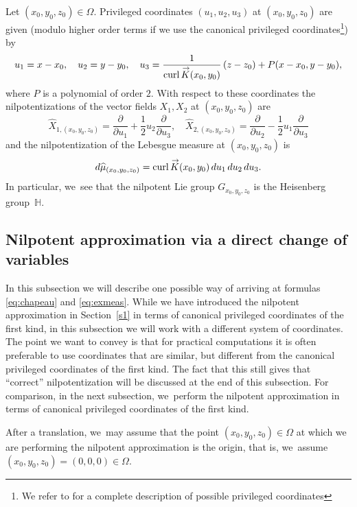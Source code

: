 \documentclass[JEP,XML,SOM,Unicode,published]{cedram}
\DeclareMathOperator{\curl}{curl}
\renewcommand{\vec}[1]
{\overset{\,{\raisebox{-2pt}{$\scriptstyle\to$}}}{#1}}
\theoremstyle{definition}
\newcommand{\1}{\mathbbm{1}}
\begin{document}
Let $(x_0,y_0,z_0)\in\Omega$. Privileged coordinates $(u_1,u_2,u_3)$ at $(x_0,y_0,z_0)$ are given (modulo higher order terms if we use the canonical privileged coordinates\footnote{We refer to \cite{ChoPo1,ChoPo2} for a complete description of possible privileged coordinates}) by
\begin{equation} \label{eq:cdv}
u_1= x-x_0,\quad u_2 = y-y_0,\quad u_3 = \frac{1}{\curl \vec{K} (x_0,y_0)} \,(z-z_0) + P (x-x_0,y-y_0),
\end{equation}
where $P$ is a polynomial of order $2$. With respect to these coordinates the nilpotentizations of the vector fields $X_1,X_2$ at $(x_0,y_0,z_0)$ are
\begin{equation}\label{eq:chapeau}
\widehat X_{1,(x_0,y_0,z_0)} = \frac{\partial}{\partial u_1} + \frac 12 u_2 \frac{\partial}{\partial u_3},\quad
\widehat X_{2,(x_0,y_0,z_0)} = \frac{\partial}{\partial u_2} - \frac 12 u_1 \frac{\partial}{\partial u_3}
\end{equation}
and the nilpotentization of the Lebesgue measure at $(x_0,y_0,z_0)$ is
\begin{equation}\label{eq:exmeas}
d\widehat\mu_{(x_0,y_0,z_0)} = \curl \vec{K} (x_0,y_0)\,du_1 \,du_2 \,du_3.
\end{equation}
In particular, we~see that the nilpotent Lie group $G_{x_0,y_0,z_0}$ is the Heisenberg group~$\mathbb H$.

\subsection{Nilpotent approximation via a direct change of variables}
In this subsection we will describe one possible way of arriving at formulas \eqref{eq:chapeau} and \eqref{eq:exmeas}. While we have introduced the nilpotent approximation in Section~\ref{s1} in terms of canonical privileged coordinates of the first kind, in this subsection we will work with a different system of coordinates. The point we want to convey is that for practical computations it is often preferable to use coordinates that are similar, but different from the canonical privileged coordinates of the first kind. The fact that this still gives that ``correct'' nilpotentization will be discussed at the end of this subsection. For comparison, in the next subsection, we~perform the nilpotent approximation in terms of canonical privileged coordinates of the first kind.

After a translation, we~may assume that the point $(x_0,y_0,z_0)\in\Omega$ at which we are performing the nilpotent approximation is the origin, that is, we~assume $(x_0,y_0,z_0)= (0,0,0) \in \Omega$.
\end{document}
